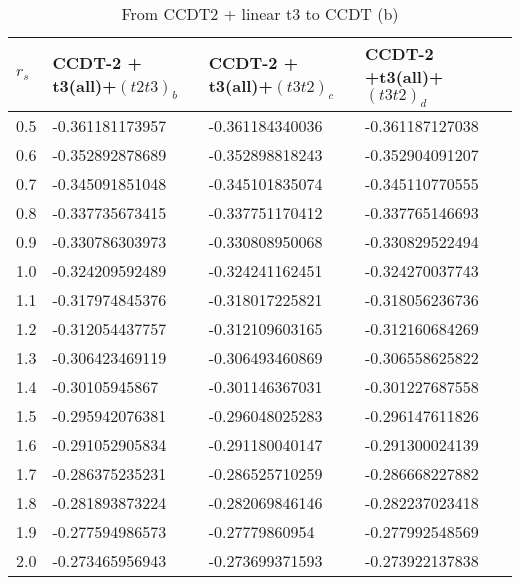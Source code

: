 \begin{table}[hbtp]
\caption{From CCDT2 + linear t3 to CCDT (b)}
\begin{center}
\begin{threeparttable}
\begin{tabular}{l l l l}
    \toprule
$r_s$ & CCDT-2 + t3(all)+$(t2t3)_b$ & CCDT-2 + t3(all)+$(t3t2)_c$ & CCDT-2 +t3(all)+$(t3t2)_d$  \\ \hline
0.5 & -0.361181173957 & -0.361184340036 & -0.361187127038   \\
0.6 & -0.352892878689 & -0.352898818243 & -0.352904091207   \\
0.7 & -0.345091851048 & -0.345101835074 & -0.345110770555   \\
0.8 & -0.337735673415 & -0.337751170412 & -0.337765146693   \\
0.9 & -0.330786303973 & -0.330808950068 & -0.330829522494   \\
1.0 & -0.324209592489 & -0.324241162451 & -0.324270037743   \\
1.1 & -0.317974845376 & -0.318017225821 & -0.318056236736   \\
1.2 & -0.312054437757 & -0.312109603165 & -0.312160684269   \\
1.3 & -0.306423469119 & -0.306493460869 & -0.306558625822   \\
1.4 & -0.30105945867 & -0.301146367031 & -0.301227687558   \\
1.5 & -0.295942076381 & -0.296048025283 & -0.296147611826   \\
1.6 & -0.291052905834 & -0.291180040147 & -0.291300024139   \\
1.7 & -0.286375235231 & -0.286525710259 & -0.286668227882   \\
1.8 & -0.281893873224 & -0.282069846146 & -0.282237023418   \\
1.9 & -0.277594986573 & -0.27779860954 & -0.277992548569   \\
2.0 & -0.273465956943 & -0.273699371593 & -0.273922137838   \\
\bottomrule
\end{tabular}
\begin{tablenotes}
\end{tablenotes}
\end{threeparttable}
\end{center}
\label{tab:ccdt3_to_ccdt_2}
\end{table}

